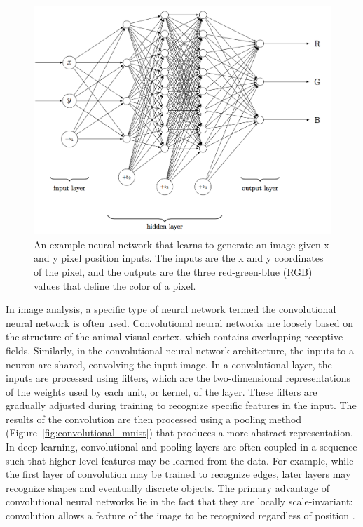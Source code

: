 \documentclass[12pt,oneside,onecolumn,a4paper]{article}
\begin{document}
\begin{figure}[H]
\begin{center}
\includegraphics[width=0.8\columnwidth]{figures/doodle}
\caption{An example neural network that learns to generate an image given x and y pixel position inputs. The inputs are the x and y coordinates of the pixel, and the outputs are the three red-green-blue (RGB) values that define the color of a pixel.
\label{fig:doodle}
}
\end{center}
\end{figure}

In image analysis, a specific type of neural network termed the convolutional neural network is often used. Convolutional neural networks are loosely based on the structure of the animal visual cortex, which contains overlapping receptive fields. Similarly, in the convolutional neural network architecture, the inputs to a neuron are shared, convolving the input image. In a convolutional layer, the inputs are processed using filters, which are the two-dimensional representations of the weights used by each unit, or kernel, of the layer. These filters are gradually adjusted during training to recognize specific features in the input. The results of the convolution are then processed using a pooling method (Figure~\ref{fig:convolutional_mnist}) that produces a more abstract representation. In deep learning, convolutional and pooling layers are often coupled in a sequence such that higher level features may be learned from the data. For example, while the first layer of convolution may be trained to recognize edges, later layers may recognize shapes and eventually discrete objects. The primary advantage of convolutional neural networks lie in the fact that they are locally scale-invariant: convolution allows a feature of the image to be recognized regardless of position \citep{Krizhevsky2012ImageNetCW}.
\end{document}
